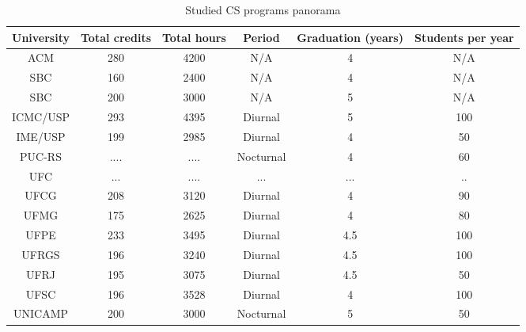 \documentclass[conference]{IEEEtran}
\begin{document}
\begin{table*}
	\centering
	\caption{Studied CS programs panorama}
    \begin{tabular}{|c|c|c|c|c|c|}
        \hline
        University         & Total credits  & Total hours & Period     & Graduation (years) & Students per year \\ \hline
        \rowcolor[gray]{.9}
        ACM \cite{cs2008}  & 280            & 4200        & N/A        & 4               & N/A                  \\
        \rowcolor[gray]{.9}
        SBC \cite{sbc}     & 160            & 2400        & N/A        & 4               & N/A                  \\ 
        \rowcolor[gray]{.9}
        SBC \cite{sbc}     & 200            & 3000        & N/A        & 5               & N/A                  \\ 
        ICMC/USP \cite{icmc}& 293           & 4395        & Diurnal    & 5               & 100                  \\ 
        IME/USP \cite{ime} & 199            & 2985        & Diurnal    & 4               & 50                   \\ 
        PUC-RS \cite{pucrs}& ....           & ....        & Nocturnal  & 4               & 60                   \\ 
        UFC \cite{ufc}     & ...            & ....        & ...        & ...             & ..                   \\ 
        UFCG \cite{ufcg}   & 208            & 3120        & Diurnal    & 4               & 90                   \\ 
        UFMG \cite{ufmg}   & 175            & 2625        & Diurnal    & 4               & 80                   \\ 
        UFPE \cite{ufpe}   & 233            & 3495        & Diurnal    & 4.5             & 100                  \\ 
        UFRGS \cite{ufrgs} & 196            & 3240        & Diurnal    & 4.5             & 100                  \\ 
        UFRJ \cite{ufrj}   & 195            & 3075        & Diurnal    & 4.5             & 50                   \\ 
        UFSC \cite{ufsc}   & 196            & 3528        & Diurnal    & 4               & 100                  \\ 
        UNICAMP \cite{unicamp}& 200         & 3000        & Nocturnal  & 5               & 50                   \\ 
        \hline
    \end{tabular}
\end{table*}
\end{document}
